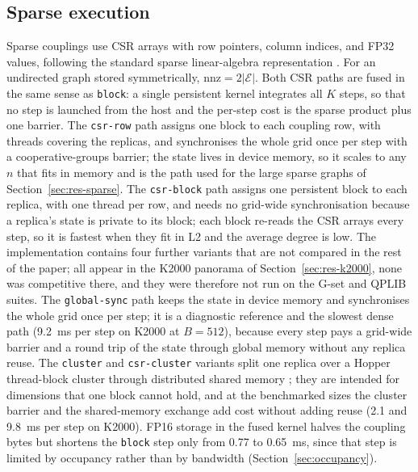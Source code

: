 \documentclass[11pt,a4paper]{article}
\newcommand{\code}[1]{\texttt{#1}}
\begin{document}
\subsection{Sparse execution}\label{sec:sparse}
Sparse couplings use CSR arrays with row pointers, column indices, and FP32 values, following the standard sparse linear-algebra representation \cite{bell2009}. For an undirected graph stored symmetrically, $\mathrm{nnz}=2|\mathcal E|$. Both CSR paths are fused in the same sense as \code{block}: a single persistent kernel integrates all $K$ steps, so that no step is launched from the host and the per-step cost is the sparse product plus one barrier. The \code{csr-row} path assigns one block to each coupling row, with threads covering the replicas, and synchronises the whole grid once per step with a cooperative-groups barrier; the state lives in device memory, so it scales to any $n$ that fits in memory and is the path used for the large sparse graphs of Section~\ref{sec:res-sparse}. The \code{csr-block} path assigns one persistent block to each replica, with one thread per row, and needs no grid-wide synchronisation because a replica's state is private to its block; each block re-reads the CSR arrays every step, so it is fastest when they fit in L2 and the average degree is low. The implementation contains four further variants that are not compared in the rest of the paper; all appear in the K2000 panorama of Section~\ref{sec:res-k2000}, none was competitive there, and they were therefore not run on the G-set and QPLIB suites. The \code{global-sync} path keeps the state in device memory and synchronises the whole grid once per step; it is a diagnostic reference and the slowest dense path (9.2~ms per step on K2000 at $B=512$), because every step pays a grid-wide barrier and a round trip of the state through global memory without any replica reuse. The \code{cluster} and \code{csr-cluster} variants split one replica over a Hopper thread-block cluster through distributed shared memory \cite{hopper}; they are intended for dimensions that one block cannot hold, and at the benchmarked sizes the cluster barrier and the shared-memory exchange add cost without adding reuse (2.1 and 9.8~ms per step on K2000). FP16 storage in the fused kernel halves the coupling bytes but shortens the \code{block} step only from 0.77 to 0.65~ms, since that step is limited by occupancy rather than by bandwidth (Section~\ref{sec:occupancy}).
\end{document}
